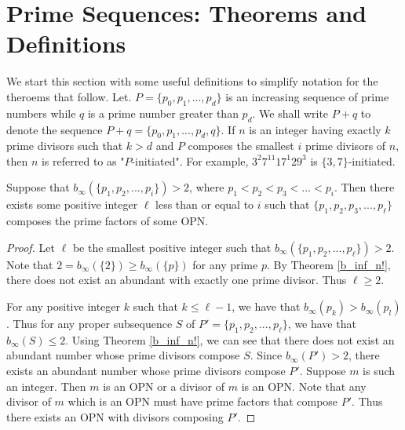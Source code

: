 \documentclass[../paper.tex]{subfiles}
\begin{document}
\section{Prime Sequences: Theorems and Definitions}

We start this section with some useful definitions to simplify
notation for the theroems that follow. Let. $P = \{p_0, p_1, ...,
p_d\}$ is an increasing sequence of prime numbers while $q$ 
is a prime number greater than $p_d$. We shall write $P + q$
to denote the sequence $P + q = \{p_0, p_1, ..., p_d, q\}$. If $n$ 
is an integer having exactly $k$ prime divisors such that $k > d$ 
and $P$ composes the smallest $i$ prime divisors of $n$, then 
$n$ is referred to as "$P$-initiated". For example, $3^2 7^{11} 
17^1 29^3$ is $\{3, 7\}$-initiated.

\begin{theorem} \label{Primechops}
Suppose that $b_{\infty}(\{p_1,p_2, ..., p_i\}) > 2$,
where $p_1 < p_2 < p_3 < ... < p_i$. Then there exists some
positive integer $\ell$ less than or equal to $i$ such that 
$\{p_1, p_2, p_3, ..., p_\ell\}$ composes the prime factors of
some OPN.
\end{theorem}

\begin{proof}
Let $\ell$ be the smallest positive integer such that 
$b_{\infty}(\{p_1, p_2, ..., p_\ell\}) > 2$. Note that
$2 = b_{\infty}(\{2\}) \geq b_{\infty}(\{p\})$ for any prime $p$.
By Theorem {\ref{b_inf_n!}}, there does not
exist an abundant with exactly one prime divisor. Thus $\ell 
\geq 2$.

For any positive integer $k$ such that $k \leq \ell - 1$, we have
that $b_{\infty}(p_k) > b_{\infty}(p_l)$. Thus for any proper 
subsequence $S$ of $P' = \{p_1, p_2, ..., p_{\ell}\}$, we have that 
$b_{\infty}(S) \leq 2$. Using Theorem {\ref{b_inf_n!}}, we can see
that there does not exist an abundant number whose prime divisors
compose $S$. Since $b_{\infty}(P') > 2$, there exists an abundant 
number whose prime
divisors compose $P'$. Suppose $m$ is such an integer. Then $m$ is
an OPN or a divisor of $m$ is an OPN. Note that any divisor of $m$
which is an OPN must have prime factors that compose $P'$. Thus
there exists an OPN with divisors composing $P'$.
\end{proof}

\end{document}
